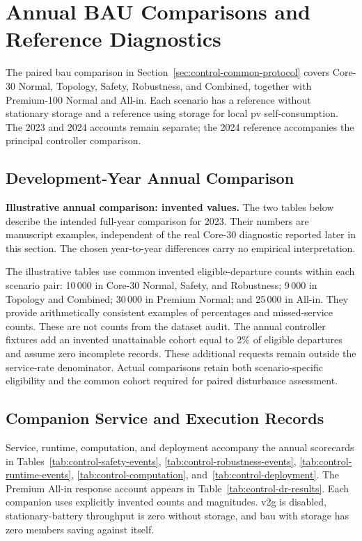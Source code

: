 \section{Annual BAU Comparisons and Reference Diagnostics}
\label{app:annual-bau}

The paired \gls{bau} comparison in Section~\ref{sec:control-common-protocol} covers Core-30 Normal, Topology, Safety, Robustness, and Combined, together with Premium-100 Normal and All-in. Each scenario has a reference without stationary storage and a reference using storage for local \gls{pv} self-consumption. The 2023 and 2024 accounts remain separate; the 2024 reference accompanies the principal controller comparison.

\subsection{Development-Year Annual Comparison}

\noindent\textcolor{orange!70!black}{\textbf{Illustrative annual comparison: invented values.}} The two tables below describe the intended full-year comparison for 2023. Their numbers are manuscript examples, independent of the real Core-30 diagnostic reported later in this section. The chosen year-to-year differences carry no empirical interpretation.




The illustrative tables use common invented eligible-departure counts within each scenario pair: 10\,000 in Core-30 Normal, Safety, and Robustness; 9\,000 in Topology and Combined; 30\,000 in Premium Normal; and 25\,000 in All-in. They provide arithmetically consistent examples of percentages and missed-service counts. These are not counts from the dataset audit. The annual controller fixtures add an invented unattainable cohort equal to 2\% of eligible departures and assume zero incomplete records. These additional requests remain outside the service-rate denominator. Actual comparisons retain both scenario-specific eligibility and the common cohort required for paired disturbance assessment.

\subsection{Companion Service and Execution Records}

Service, runtime, computation, and deployment accompany the annual scorecards in Tables~\ref{tab:control-safety-events}, \ref{tab:control-robustness-events}, \ref{tab:control-runtime-events}, \ref{tab:control-computation}, and~\ref{tab:control-deployment}. The Premium All-in response account appears in Table~\ref{tab:control-dr-results}. Each companion uses explicitly invented counts and magnitudes. \gls{v2g} is disabled, stationary-battery throughput is zero without storage, and \gls{bau} with storage has zero members saving against itself.

